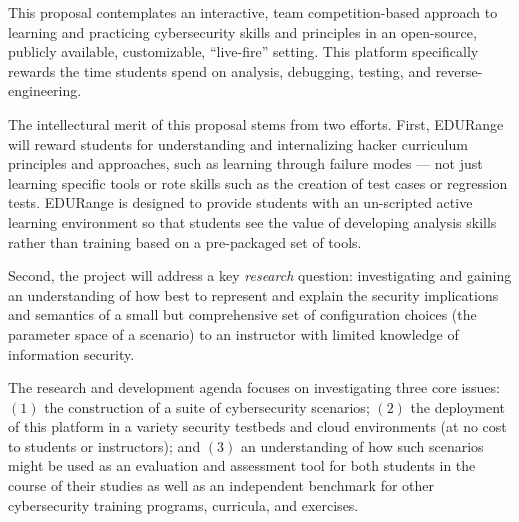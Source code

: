 \documentclass[11pt]{report}
\begin{document}
This proposal contemplates an interactive, team competition-based
approach to learning and practicing cybersecurity skills and
principles in an open-source, publicly available, customizable,
``live-fire'' setting.  This platform specifically rewards the time
students spend on analysis, debugging, testing, and
reverse-engineering.  



The intellectural merit of this proposal stems from two efforts.
First, EDURange will reward students for understanding and
internalizing hacker curriculum principles and approaches, such as
learning through failure modes --- not just learning specific tools or rote skills
such as the creation of test cases or regression tests.  EDURange is
designed to provide students with an un-scripted active learning
environment so that students see the value of developing analysis
skills rather than training based on a pre-packaged set of tools.

Second, the project will address a key {\em research} question:
investigating and gaining an understanding of how best to represent and explain the
security implications and semantics of a small but comprehensive set of
configuration choices (the parameter space of a scenario) to an
instructor with limited knowledge of information security.  

The research and development agenda focuses on investigating three
core issues: $(1)$ the construction of a suite of cybersecurity
scenarios; $(2)$ the deployment of this platform in a variety security
testbeds and cloud environments (at no cost to students or
instructors); and $(3)$ an understanding of how such scenarios might
be used as an evaluation and assessment tool for both students in the
course of their studies as well as an independent benchmark for other
cybersecurity training programs, curricula, and exercises.
\end{document}
